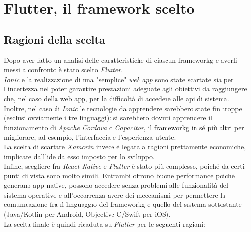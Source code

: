 \section{Flutter, il framework scelto}
\label{sec:scelta-flutter}

\subsection{Ragioni della scelta}
\label{subsec:ragioni-scelta}

Dopo aver fatto un analisi delle caratteristiche di ciascun \gls{frameworkg} e averli messi a confronto è stato scelto \emph{Flutter}.\\
\emph{Ionic} e la realizzazione di una "semplice" \emph{web app} sono state scartate sia per l'incertezza nel poter garantire prestazioni adeguate agli obiettivi da raggiungere che, nel caso della web app, per la difficoltà di accedere alle \gls{api} di sistema.
Inoltre, nel caso di \emph{Ionic} le tecnologie da apprendere sarebbero state fin troppe (esclusi ovviamente i tre linguaggi): si sarebbero dovuti apprendere il funzionamento di \emph{Apache Cordova} o \emph{Capacitor}, il \gls{frameworkg} in sé più altri per migliorare, ad esempio, l'interfaccia e l'esperienza utente.\\
La scelta di scartare \emph{Xamarin} invece è legata a ragioni prettamente economiche, implicate dall'\gls{ide} da esso imposto per lo sviluppo.\\
Infine, scegliere fra \emph{React Native} e \emph{Flutter} è stato più complesso, poiché da certi punti di vista sono molto simili. Entrambi offrono buone performance poiché generano app native, possono accedere senza problemi alle funzionalità del sistema operativo e all'occorrenza avere dei meccanismi per permettere la comunicazione fra il linguaggio del \gls{frameworkg} e quello del sistema sottostante (Java/Kotlin per Android, Objective-C/Swift per iOS).\\
La scelta finale è quindi ricaduta su \emph{Flutter} per le seguenti ragioni:
